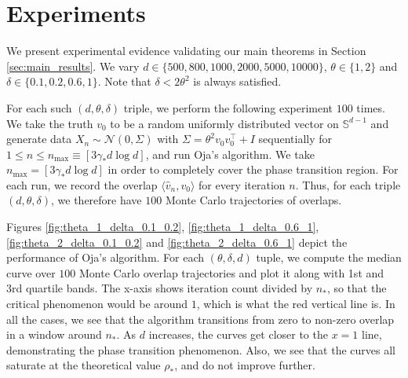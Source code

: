 \documentclass[12pt]{article}
\def\gN{{\mathcal{N}}}
\def\sS{{\mathbb{S}}}
\begin{document}
\section{Experiments}\label{sec:experiments}

We present experimental evidence validating our main theorems in Section \ref{sec:main_results}. We vary $d\in\{500, 800, 1000, 2000, 5000, 10000\}$, $\theta\in\{1,2\}$ and $\delta\in\{0.1, 0.2, 0.6, 1\}$. Note that $\delta<2\theta^2$ is always satisfied. 

\medskip

For each such $(d,\theta,\delta)$ triple, we perform the following experiment $100$ times. We take the truth $v_0$ to be a random uniformly distributed vector on $\sS^{d-1}$ and generate data $X_n\sim \gN(0,\Sigma)$ with $\Sigma=\theta^2v_0v_0^\top+I$ sequentially for $1\leq n\leq n_{\max}\equiv [3\gamma_*d\log d]$, and run Oja's algorithm. We take $n_{\max}=[3\gamma_*d\log d]$ in order to completely cover the phase transition region. For each run, we record the overlap $\langle \hat v_n,v_0\rangle$ for every iteration $n$. Thus, for each triple $(d,\theta,\delta)$, we therefore have $100$ Monte Carlo trajectories of overlaps.

\medskip

Figures \ref{fig:theta_1_delta_0.1_0.2}, \ref{fig:theta_1_delta_0.6_1}, \ref{fig:theta_2_delta_0.1_0.2} and \ref{fig:theta_2_delta_0.6_1} depict the performance of Oja's algorithm. For each $(\theta,\delta, d)$ tuple, we compute the median curve over $100$ Monte Carlo overlap trajectories and plot it along with 1st and 3rd quartile bands. The x-axis shows iteration count divided by $n_*$, so that the critical phenomenon would be around $1$, which is what the red vertical line is. In all the cases, we see that the algorithm transitions from zero to non-zero overlap in a window around $n_*$. As $d$ increases, the curves get closer to the $x=1$ line, demonstrating the phase transition phenomenon. Also, we see that the curves all saturate at the theoretical value $\rho_*$, and do not improve further.

\medskip
\end{document}
